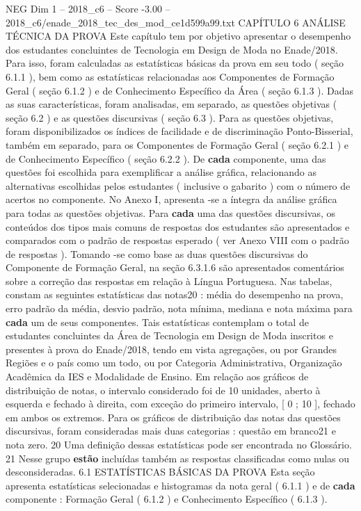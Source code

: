 \begin{textsample}{NEG Dim 1 – 2018\_c6 – Score -3.00 – 2018\_c6/enade\_2018\_tec\_des\_mod\_ce1d599a99.txt}  \label{ex:f1_neg_198}
CAPÍTULO 6 ANÁLISE TÉCNICA DA PROVA Este capítulo tem por objetivo apresentar o desempenho dos estudantes concluintes de Tecnologia em Design de Moda no Enade/2018.
Para isso, foram calculadas as estatísticas básicas da prova em seu todo ( seção 6.1.1 ), bem como as estatísticas relacionadas aos Componentes de Formação Geral ( seção 6.1.2 ) e de Conhecimento Específico da Área ( seção 6.1.3 ).
Dadas as suas características, foram analisadas, em separado, as questões objetivas ( seção 6.2 ) e as questões discursivas ( seção 6.3 ).
Para as questões objetivas, foram disponibilizados os índices de facilidade e de discriminação Ponto-Bisserial, também em separado, para os Componentes de Formação Geral ( seção 6.2.1 ) e de Conhecimento Específico ( seção 6.2.2 ).
De \textbf{cada} componente, uma das questões foi escolhida para exemplificar a análise gráfica, relacionando as alternativas escolhidas pelos estudantes ( inclusive o gabarito ) com o número de acertos no componente.
No Anexo I, apresenta -se a íntegra da análise gráfica para todas as questões objetivas.
Para \textbf{cada} uma das questões discursivas, os conteúdos dos tipos mais comuns de respostas dos estudantes são apresentados e comparados com o padrão de respostas esperado ( ver Anexo VIII com o padrão de respostas ).
Tomando -se como base as duas questões discursivas do Componente de Formação Geral, na seção 6.3.1.6 são apresentados comentários sobre a correção das respostas em relação à Língua Portuguesa.
Nas tabelas, constam as seguintes estatísticas das notas20 : média do desempenho na prova, erro padrão da média, desvio padrão, nota mínima, mediana e nota máxima para \textbf{cada} um de seus componentes.
Tais estatísticas contemplam o total de estudantes concluintes da Área de Tecnologia em Design de Moda inscritos e presentes à prova do Enade/2018, tendo em vista agregações, ou por Grandes Regiões e o país como um todo, ou por Categoria Administrativa, Organização Acadêmica da IES e Modalidade de Ensino.
Em relação aos gráficos de distribuição de notas, o intervalo considerado foi de 10 unidades, aberto à esquerda e fechado à direita, com exceção do primeiro intervalo, [ 0 ; 10 ], fechado em ambos os extremos.
Para os gráficos de distribuição das notas das questões discursivas, foram consideradas mais duas categorias : questão em branco21 e nota zero. 20 Uma definição dessas estatísticas pode ser encontrada no Glossário. 21 Nesse grupo \textbf{estão} incluídas também as respostas classificadas como nulas ou desconsideradas. 6.1 ESTATÍSTICAS BÁSICAS DA PROVA Esta seção apresenta estatísticas selecionadas e histogramas da nota geral ( 6.1.1 ) e de \textbf{cada} componente : Formação Geral ( 6.1.2 ) e Conhecimento Específico ( 6.1.3 ).

\end{textsample}
